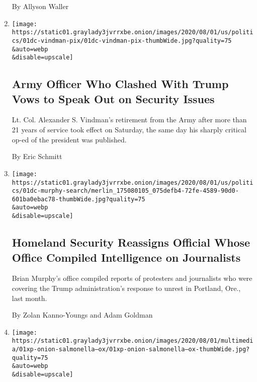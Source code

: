 \begin{enumerate}
  By Allyson Waller
\item
  \href{/2020/08/01/us/politics/alexander-vindman-impeachment-trump.html}{}

  \texttt{[image: https://static01.graylady3jvrrxbe.onion/images/2020/08/01/us/politics/01dc-vindman-pix/01dc-vindman-pix-thumbWide.jpg?quality=75\\\&auto=webp\\\&disable=upscale]}

  \hypertarget{army-officer-who-clashed-with-trump-vows-to-speak-out-on-security-issues}{%
  \subsection{Army Officer Who Clashed With Trump Vows to Speak Out on
  Security
  Issues}\label{army-officer-who-clashed-with-trump-vows-to-speak-out-on-security-issues}}

  Lt. Col. Alexander S. Vindman's retirement from the Army after more
  than 21 years of service took effect on Saturday, the same day his
  sharply critical op-ed of the president was published.

  By Eric Schmitt
\item
  \href{/2020/08/01/us/politics/brian-murphy-homeland-security-protesters.html}{}

  \texttt{[image: https://static01.graylady3jvrrxbe.onion/images/2020/08/01/us/politics/01dc-murphy-search/merlin\_175080105\_075defb4-72fe-4589-90d0-601ba0ebac78-thumbWide.jpg?quality=75\\\&auto=webp\\\&disable=upscale]}

  \hypertarget{homeland-security-reassigns-official-whose-office-compiled-intelligence-on-journalists}{%
  \subsection{Homeland Security Reassigns Official Whose Office Compiled
  Intelligence on
  Journalists}\label{homeland-security-reassigns-official-whose-office-compiled-intelligence-on-journalists}}

  Brian Murphy's office compiled reports of protesters and journalists
  who were covering the Trump administration's response to unrest in
  Portland, Ore., last month.

  By Zolan Kanno-Youngs and Adam Goldman
\item
  \href{/2020/08/01/us/salmonella-outbreak-onions.html}{}

  \texttt{[image: https://static01.graylady3jvrrxbe.onion/images/2020/08/01/multimedia/01xp-onion-salmonella--ox/01xp-onion-salmonella--ox-thumbWide.jpg?quality=75\\\&auto=webp\\\&disable=upscale]}


\end{enumerate}
